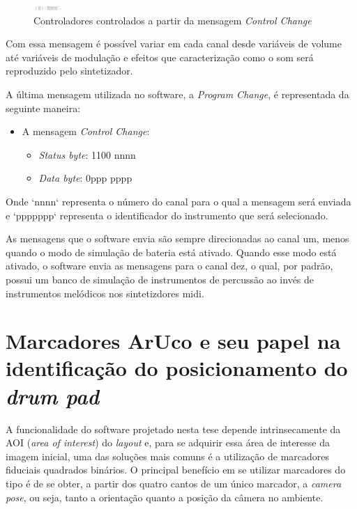 \documentclass[12pt]{report}
\begin{document}
\begin{figure}[H]
  \centering
    \includegraphics[width=0.1\textwidth]{imagens/controladores.png}
    \caption{Controladores controlados a partir da mensagem {\it Control Change}}
  \label{fig:controladores}
\end{figure}

Com essa mensagem é possível variar em cada canal desde variáveis de
volume até variáveis de modulação e efeitos que caracterização como o
som será reproduzido pelo sintetizador.

A última mensagem utilizada no software, a  {\it Program  Change}, é
representada da seguinte maneira:
\begin{itemize}
  \item A mensagem {\it Control Change}:
  \begin{itemize}
    \item {\it Status byte}: 1100 nnnn
    \item {\it Data byte}: 0ppp pppp
  \end{itemize}
\end{itemize}

Onde `nnnn` representa o número do canal para o qual a mensagem será
enviada e `ppppppp` representa o identificador do instrumento que será
selecionado.

As mensagens que o software envia são sempre direcionadas ao canal um, menos quando o modo de simulação de bateria está ativado. Quando esse modo está ativado, o software envia as mensagens para o canal dez, o qual, por padrão, possui um banco de simulação de instrumentos de percussão ao invés de instrumentos melódicos nos sintetizdores midi.

\chapter{Marcadores ArUco e seu papel na identificação do
  posicionamento do {\it drum pad}}
\label{cha:aruco}

A funcionalidade do software projetado nesta tese depende
intrinsecamente da AOI ({\it area of interest}) do {\it layout} e,
para se adquirir essa área de interesse da imagem inicial, uma das
soluções mais comuns é a utilização de marcadores fiduciais quadrados
binários. O principal benefício em se utilizar marcadores do tipo é de
se obter, a partir dos quatro cantos de um único marcador, a {\it
  camera pose}, ou seja, tanto a orientação quanto a posição da câmera
no ambiente.
\end{document}
